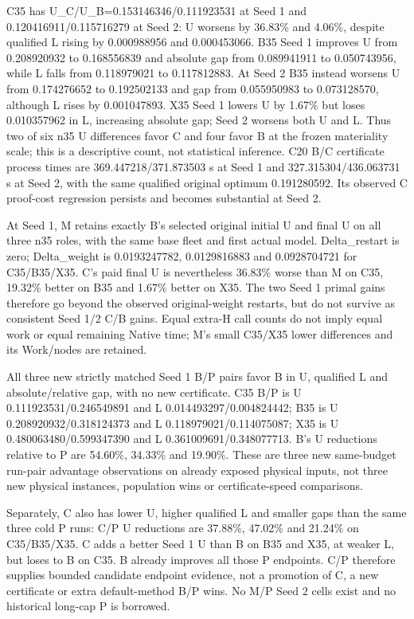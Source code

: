 \documentclass[
  american,
  11pt,
]{article}
\begin{document}
C35 has U\_\allowbreak{}C/U\_\allowbreak{}B=0.153146346/0.111923531 at Seed 1 and
0.120416911/0.115716279 at Seed 2: U worsens by 36.83\% and 4.06\%,
despite qualified L rising by 0.000988956 and 0.000453066. B35 Seed 1
improves U from 0.208920932 to 0.168556839 and absolute gap from
0.089941911 to 0.050743956, while L falls from 0.118979021 to
0.117812883. At Seed 2 B35 instead worsens U from 0.174276652 to
0.192502133 and gap from 0.055950983 to 0.073128570, although L rises by
0.001047893. X35 Seed 1 lowers U by 1.67\% but loses 0.010357962 in L,
increasing absolute gap; Seed 2 worsens both U and L. Thus two of six
n35 U differences favor C and four favor B at the frozen materiality
scale; this is a descriptive count, not statistical inference. C20 B/C
certificate process times are 369.447218/371.873503 s at Seed 1 and
327.315304/436.063731 s at Seed 2, with the same qualified original
optimum 0.191280592. Its observed C proof-cost regression persists and
becomes substantial at Seed 2.

At Seed 1, M retains exactly B's selected original initial U and final U
on all three n35 roles, with the same base fleet and first actual model.
Delta\_\allowbreak{}restart is zero; Delta\_\allowbreak{}weight is 0.0193247782, 0.0129816883 and
0.0928704721 for C35/B35/X35. C's paid final U is nevertheless 36.83\%
worse than M on C35, 19.32\% better on B35 and 1.67\% better on X35. The
two Seed 1 primal gains therefore go beyond the observed original-weight
restarts, but do not survive as consistent Seed 1/2 C/B gains. Equal
extra-H call counts do not imply equal work or equal remaining Native
time; M's small C35/X35 lower differences and its Work/nodes are
retained.

All three new strictly matched Seed 1 B/P pairs favor B in U, qualified
L and absolute/relative gap, with no new certificate. C35 B/P is U
0.111923531/0.246549891 and L 0.014493297/0.004824442; B35 is U
0.208920932/0.318124373 and L 0.118979021/0.114075087; X35 is U
0.480063480/0.599347390 and L 0.361009691/0.348077713. B's U reductions
relative to P are 54.60\%, 34.33\% and 19.90\%. These are three new
same-budget run-pair advantage observations on already exposed physical
inputs, not three new physical instances, population wins or
certificate-speed comparisons.

Separately, C also has lower U, higher qualified L and smaller gaps than
the same three cold P runs: C/P U reductions are 37.88\%, 47.02\% and
21.24\% on C35/B35/X35. C adds a better Seed 1 U than B on B35 and X35,
at weaker L, but loses to B on C35. B already improves all those P
endpoints. C/P therefore supplies bounded candidate endpoint evidence,
not a promotion of C, a new certificate or extra default-method B/P
wins. No M/P Seed 2 cells exist and no historical long-cap P is
borrowed.
\end{document}
